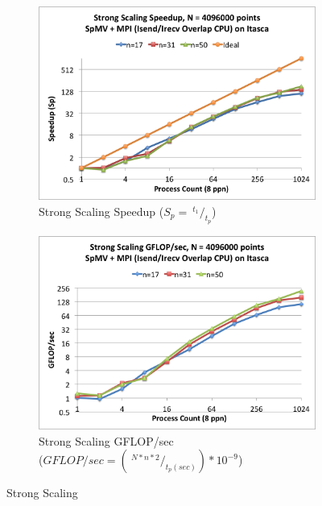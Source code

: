 \documentclass{report}
\begin{document}
\begin{figure}
\centering
\begin{subfigure}[t]{0.48\textwidth}
\centering
\includegraphics[width=\textwidth]{performance_content/scaling/strong_scaling_speedup_4M_overlap_cpu_SpMV_and_comm_all_stencils.png}
\caption{Strong Scaling Speedup ($S_p = \ ^{t_{1}}/_{t_p}$)}
\label{fig:compare_strong_scaling_speedup_all_stencils}
\end{subfigure}
\quad
\begin{subfigure}[t]{0.48\textwidth}
\centering
\includegraphics[width=\textwidth]{performance_content/scaling/strong_scaling_gflops_4M_overlap_cpu_SpMV_and_comm_all_stencils.png}
\caption{Strong Scaling GFLOP/sec \\ ($GFLOP/sec = (\ ^{N * n * 2}/_{t_p  (sec)}) * 10^{-9}$)}
\label{fig:compare_strong_scaling_gflops_all_stencils}
\end{subfigure}
\caption{Strong Scaling}
\label{fig:strong_scaling_factors}
\end{figure} 
\end{document}
